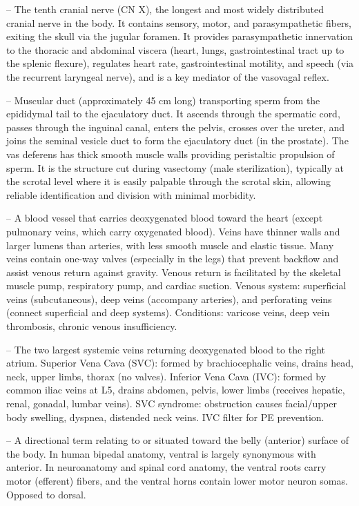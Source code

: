 -- The tenth cranial nerve (CN X), the longest and most widely distributed cranial nerve in the body. It contains sensory, motor, and parasympathetic fibers, exiting the skull via the jugular foramen. It provides parasympathetic innervation to the thoracic and abdominal viscera (heart, lungs, gastrointestinal tract up to the splenic flexure), regulates heart rate, gastrointestinal motility, and speech (via the recurrent laryngeal nerve), and is a key mediator of the vasovagal reflex.

-- Muscular duct (approximately 45 cm long) transporting sperm from the epididymal tail to the ejaculatory duct. It ascends through the spermatic cord, passes through the inguinal canal, enters the pelvis, crosses over the ureter, and joins the seminal vesicle duct to form the ejaculatory duct (in the prostate). The vas deferens has thick smooth muscle walls providing peristaltic propulsion of sperm. It is the structure cut during vasectomy (male sterilization), typically at the scrotal level where it is easily palpable through the scrotal skin, allowing reliable identification and division with minimal morbidity.

-- A blood vessel that carries deoxygenated blood toward the heart (except pulmonary veins, which carry oxygenated blood). Veins have thinner walls and larger lumens than arteries, with less smooth muscle and elastic tissue. Many veins contain one-way valves (especially in the legs) that prevent backflow and assist venous return against gravity. Venous return is facilitated by the skeletal muscle pump, respiratory pump, and cardiac suction. Venous system: superficial veins (subcutaneous), deep veins (accompany arteries), and perforating veins (connect superficial and deep systems). Conditions: varicose veins, deep vein thrombosis, chronic venous insufficiency.

-- The two largest systemic veins returning deoxygenated blood to the right atrium. Superior Vena Cava (SVC): formed by brachiocephalic veins, drains head, neck, upper limbs, thorax (no valves). Inferior Vena Cava (IVC): formed by common iliac veins at L5, drains abdomen, pelvis, lower limbs (receives hepatic, renal, gonadal, lumbar veins). SVC syndrome: obstruction causes facial/upper body swelling, dyspnea, distended neck veins. IVC filter for PE prevention.

-- A directional term relating to or situated toward the belly (anterior) surface of the body. In human bipedal anatomy, ventral is largely synonymous with anterior. In neuroanatomy and spinal cord anatomy, the ventral roots carry motor (efferent) fibers, and the ventral horns contain lower motor neuron somas. Opposed to dorsal.

